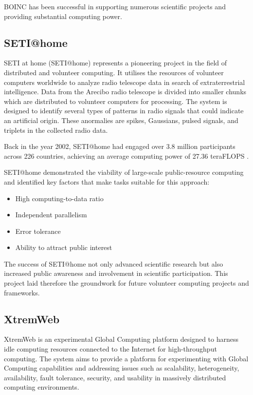 BOINC has been successful in supporting numerous scientific projects and providing substantial computing power. \cite{relatedwork:boinc1}

\subsection{SETI@home}
\label{subsec:background:related_work:seti}
\ac{SETI} at home (\ac{SETI}@home) represents a pioneering project in the field of distributed and volunteer computing. It utilises the resources of volunteer computers worldwide to analyze radio telescope data in search of extraterrestrial intelligence. Data from the Arecibo radio telescope is divided into smaller chunks which are distributed to volunteer computers for processing. The system is designed to identify several types of patterns in radio signals that could indicate an artificial origin. These anormalies are spikes, Gaussians, pulsed signals, and triplets in the collected radio data. \cite{relatedwork:seti}

Back in the year 2002, \ac{SETI}@home had engaged over 3.8 million participants across 226 countries, achieving an average computing power of 27.36 teraFLOPS \cite{relatedwork:seti}.

\ac{SETI}@home demonstrated the viability of large-scale public-resource computing and identified key factors that make tasks suitable for this approach:
\begin{itemize}
  \item High computing-to-data ratio
  \item Independent parallelism
  \item Error tolerance
  \item Ability to attract public interest
\end{itemize}
The success of \ac{SETI}@home not only advanced scientific research but also increased public awareness and involvement in scientific participation. This project laid therefore the groundwork for future volunteer computing projects and frameworks. \cite{relatedwork:seti}

\subsection{XtremWeb}
\label{subsec:background:related_work:xtremweb}
XtremWeb is an experimental Global Computing platform designed to harness idle computing resources connected to the Internet for high-throughput computing. The system aims to provide a platform for experimenting with Global Computing capabilities and addressing issues such as scalability, heterogeneity, availability, fault tolerance, security, and usability in massively distributed computing environments. \cite{relatedwork:xtremweb}

